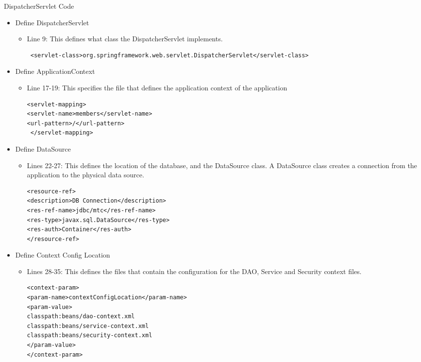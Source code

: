 \begin{table}[H]
\caption{DispatcherServlet Code}
\begin{itemize}
\item Define DispatcherServlet
\begin{itemize}
\item Line 9: This defines what class the DispatcherServlet implements.
\begin{lstlisting}
 <servlet-class>org.springframework.web.servlet.DispatcherServlet</servlet-class>
\end{lstlisting}
\end{itemize}
\item Define ApplicationContext
\begin{itemize}
\item Line 17-19: This specifies the file that defines the application context of the application
\begin{lstlisting}
<servlet-mapping>
<servlet-name>members</servlet-name>
<url-pattern>/</url-pattern>
 </servlet-mapping>
\end{lstlisting}
\end{itemize}
\item Define DataSource
\begin{itemize}
\item Lines 22-27: This defines the location of the database, and the DataSource class. A DataSource class creates a connection from the application to the physical data source.
\begin{lstlisting}
<resource-ref>
<description>DB Connection</description>
<res-ref-name>jdbc/mtc</res-ref-name>
<res-type>javax.sql.DataSource</res-type>
<res-auth>Container</res-auth>
</resource-ref>
\end{lstlisting}
\end{itemize}
\item Define Context Config Location
\begin{itemize}
\item Lines 28-35: This defines the files that contain the configuration for the DAO, Service and Security context files.
\begin{lstlisting}
<context-param>
<param-name>contextConfigLocation</param-name>
<param-value>
classpath:beans/dao-context.xml
classpath:beans/service-context.xml
classpath:beans/security-context.xml
</param-value>
</context-param>
\end{lstlisting}
\end{itemize}
\end{itemize}
\label{fig:webxmlExplain}
\end{table}

